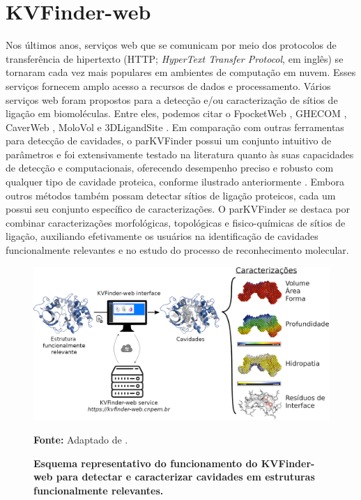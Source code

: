 \documentclass[Portugues]{phdquali}
\begin{document}
\section{KVFinder-web}

Nos últimos anos, serviços web que se comunicam por meio dos protocolos de transferência de hipertexto (HTTP; \textit{HyperText Transfer Protocol}, em inglês) se tornaram cada vez mais populares em ambientes de computação em nuvem. Esses serviços fornecem amplo acesso a recursos de dados e processamento. Vários serviços web foram propostos para a detecção e/ou caracterização de sítios de ligação em biomoléculas. Entre eles, podemos citar o FpocketWeb \cite{fpocketweb}, GHECOM \cite{ghecom}, CaverWeb \cite{caverweb}, MoloVol \cite{molovol} e 3DLigandSite \cite{3dligandsite}. Em comparação com outras ferramentas para detecção de cavidades, o parKVFinder possui um conjunto intuitivo de parâmetros e foi extensivamente testado na literatura quanto às suas capacidades de detecção e computacionais, oferecendo desempenho preciso e robusto com qualquer tipo de cavidade proteica, conforme ilustrado anteriormente \cite{guerra2019,guerra2020}. Embora outros métodos também possam detectar sítios de ligação proteicos, cada um possui seu conjunto específico de caracterizações. O parKVFinder se destaca por combinar caracterizações morfológicas, topológicas e fisico-químicas de sítios de ligação, auxiliando efetivamente os usuários na identificação de cavidades funcionalmente relevantes e no estudo do processo de reconhecimento molecular.

\begin{figure}[h]
  \centering
  \includegraphics[scale=1.5]{images/kvweb-overview.png}
  \centerline{\scriptsize{\textbf{Fonte:} Adaptado de \cite{guerra2023A}.}}
  \caption[Esquema representativo do funcionamento do KVFinder-web para detectar e caracterizar cavidades em estruturas funcionalmente relevantes]{\textbf{Esquema representativo do funcionamento do KVFinder-web para detectar e caracterizar cavidades em estruturas funcionalmente relevantes.}}
  \label{fig:kvweb-overview}
\end{figure}
\end{document}
